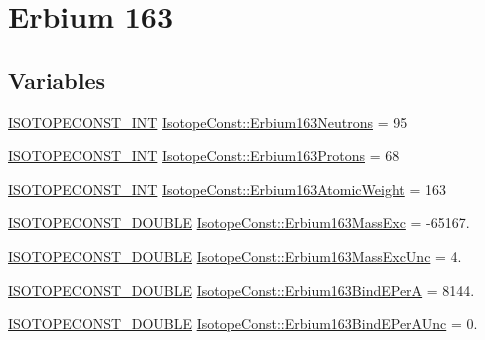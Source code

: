 \hypertarget{group___isotope_const-_erbium-_er163}{}\section{Erbium 163}
\label{group___isotope_const-_erbium-_er163}
\subsection*{Variables}
\begin{DoxyCompactItemize}
\item 
\mbox{\hyperlink{group___isotope_const-_macros_ga5f18360b3e99483a35c32d789e62621c}{I\+S\+O\+T\+O\+P\+E\+C\+O\+N\+S\+T\+\_\+\+I\+NT}} \mbox{\hyperlink{group___isotope_const-_erbium-_er163_ga93e3c41630f8145bb8d5979d75148886}{Isotope\+Const\+::\+Erbium163\+Neutrons}} = 95
\item 
\mbox{\hyperlink{group___isotope_const-_macros_ga5f18360b3e99483a35c32d789e62621c}{I\+S\+O\+T\+O\+P\+E\+C\+O\+N\+S\+T\+\_\+\+I\+NT}} \mbox{\hyperlink{group___isotope_const-_erbium-_er163_ga652219b12d47066f2911e4c8530d6ebe}{Isotope\+Const\+::\+Erbium163\+Protons}} = 68
\item 
\mbox{\hyperlink{group___isotope_const-_macros_ga5f18360b3e99483a35c32d789e62621c}{I\+S\+O\+T\+O\+P\+E\+C\+O\+N\+S\+T\+\_\+\+I\+NT}} \mbox{\hyperlink{group___isotope_const-_erbium-_er163_gae7fe91e879e50e2ff54ef101b713c260}{Isotope\+Const\+::\+Erbium163\+Atomic\+Weight}} = 163
\item 
\mbox{\hyperlink{group___isotope_const-_macros_ga8f45a7272ce02c0b4c65c44636ed719a}{I\+S\+O\+T\+O\+P\+E\+C\+O\+N\+S\+T\+\_\+\+D\+O\+U\+B\+LE}} \mbox{\hyperlink{group___isotope_const-_erbium-_er163_gacd8d24689c075d54810b3ca765190494}{Isotope\+Const\+::\+Erbium163\+Mass\+Exc}} = -\/65167.
\item 
\mbox{\hyperlink{group___isotope_const-_macros_ga8f45a7272ce02c0b4c65c44636ed719a}{I\+S\+O\+T\+O\+P\+E\+C\+O\+N\+S\+T\+\_\+\+D\+O\+U\+B\+LE}} \mbox{\hyperlink{group___isotope_const-_erbium-_er163_ga76f668557ef01f1895850039fec66767}{Isotope\+Const\+::\+Erbium163\+Mass\+Exc\+Unc}} = 4.
\item 
\mbox{\hyperlink{group___isotope_const-_macros_ga8f45a7272ce02c0b4c65c44636ed719a}{I\+S\+O\+T\+O\+P\+E\+C\+O\+N\+S\+T\+\_\+\+D\+O\+U\+B\+LE}} \mbox{\hyperlink{group___isotope_const-_erbium-_er163_ga8630aef5fa6f0d60e457b35ded5ef26f}{Isotope\+Const\+::\+Erbium163\+Bind\+E\+PerA}} = 8144.
\item 
\mbox{\hyperlink{group___isotope_const-_macros_ga8f45a7272ce02c0b4c65c44636ed719a}{I\+S\+O\+T\+O\+P\+E\+C\+O\+N\+S\+T\+\_\+\+D\+O\+U\+B\+LE}} \mbox{\hyperlink{group___isotope_const-_erbium-_er163_ga2623670cc1d7aeb1108e191a87fc6184}{Isotope\+Const\+::\+Erbium163\+Bind\+E\+Per\+A\+Unc}} = 0.

\end{DoxyCompactItemize}
